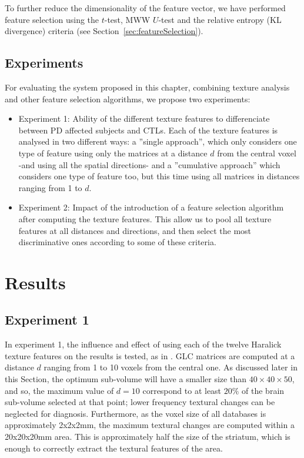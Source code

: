 To further reduce the dimensionality of the feature vector, we have performed feature selection using the $t$-test, \ac{MWW} $U$-test and the relative entropy (\ac{KL} divergence) criteria (see Section~\ref{sec:featureSelection}). 

\subsection{Experiments}
For evaluating the system proposed in this chapter, combining texture analysis and other feature selection algorithms, we propose two experiments: 
\begin{itemize}
	\item Experiment 1: Ability of the different texture features to differenciate between \ac{PD} affected subjects and \acp{CTL}. Each of the texture features is analysed in two different ways: a ''single approach'', which only considers one type of feature using only the matrices at a distance $d$ from the central voxel -and using all the spatial directions- and a ''cumulative approach'' which considers one type of feature too, but this time using all matrices in distances ranging from 1 to $d$. 
	\item Experiment 2: Impact of the introduction of a feature selection algorithm after computing the texture features. This allow us to pool all texture features at all distances and directions, and then select the most discriminative ones according to some of these criteria.  
\end{itemize}



\section{Results}\label{sec:ch5results}
\subsection{Experiment 1}
In experiment 1, the influence and effect of using each of the twelve Haralick texture features on the results is tested, as in \cite{Martinez-Murcia2013266}. GLC matrices are computed at a distance $d$ ranging from 1 to 10 voxels from the central one. As discussed later in this Section, the optimum sub-volume will have a smaller size than $40\times40\times50$, and so, the maximum value of $d=10$ correspond to at least $20\%$ of the brain sub-volume selected at that point; lower frequency textural changes can be neglected for diagnosis. Furthermore, as the voxel size of all databases is approximately 2x2x2mm, the maximum textural changes are computed within a 20x20x20mm area. This is approximately half the size of the striatum, which is enough to correctly extract the textural features of the area. 

